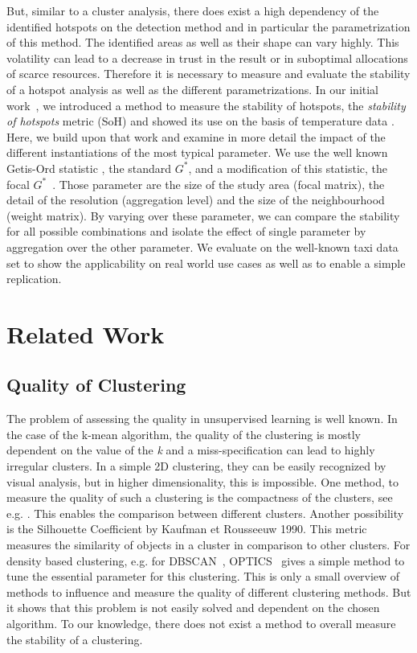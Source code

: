 \documentclass{itatnew}
\begin{document}
But, similar to a cluster analysis, there does exist a high dependency of the identified hotspots on the detection method and in particular the parametrization of this method. The identified areas as well as their shape can vary highly. This volatility can lead to a decrease in trust in the result or in suboptimal allocations of scarce resources. Therefore it is necessary to measure and evaluate the stability of a hotspot analysis as well as the different parametrizations. 
In our initial work~\cite{SoH-GI-Forum}, we introduced a method to measure the stability of hotspots, the \emph{stability of hotspots} metric (SoH) and showed its use on the basis of temperature data .   
Here, we build upon that work and examine in more detail the impact of the 
different instantiations of the most typical parameter. We use the well known 
Getis-Ord statistic \cite{Ord.1995}, the standard $G^*$, and a modification of 
this statistic, the focal $G^*$~\cite{SoH-GI-Forum}. Those parameter are the 
size of the study area (focal matrix), the detail of the resolution 
(aggregation level) and the size of the neighbourhood (weight matrix). By 
varying over these parameter, we can compare the stability for all possible 
combinations and isolate the effect of single parameter by aggregation over the 
other parameter. 
We evaluate on the well-known taxi data set to show the applicability on real world use cases as well as to enable a simple replication. 


\section{Related Work}

\subsection{Quality of Clustering}
The problem of assessing the quality in unsupervised learning is well known. In the case of the k-mean algorithm, the quality of the clustering is mostly dependent on the value of the \emph{k} and a miss-specification can lead to highly irregular clusters. In a simple 2D clustering, they can be easily recognized by visual analysis, but in higher dimensionality, this is impossible. One method, to measure the quality of such a clustering is the compactness of the clusters, see e.g. \cite{CompactnessDataClustering}. This enables the comparison between different clusters. Another possibility is the Silhouette Coefficient by Kaufman et Rousseeuw 1990. This metric measures the similarity of objects in a cluster in comparison to other clusters. For density based clustering, e.g. for DBSCAN~\cite{Ester96adensity-based}, OPTICS~\cite{Ankerst:1999:OOP:304181.304187} gives a simple method to tune the essential parameter for this clustering. This is only a small overview of methods to influence and measure the quality of different clustering methods. But it shows that this problem is not easily solved and dependent on the chosen algorithm. To our knowledge, there does not exist a method to overall measure the stability of a clustering.
\end{document}
